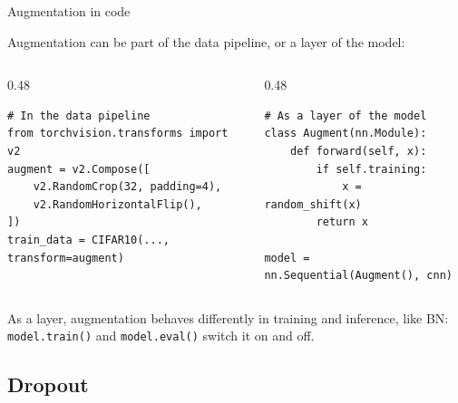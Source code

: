 \documentclass[11pt,aspectratio=169]{beamer}
\begin{document}
\begin{frame}[fragile]{Augmentation in code}
    \setlength{\parskip}{5pt}

    Augmentation can be part of the data pipeline, or a layer of the model:

    \begin{columns}[T,onlytextwidth]
        \begin{column}{0.48\textwidth}
            \scriptsize
            \begin{verbatim}
# In the data pipeline
from torchvision.transforms import v2
augment = v2.Compose([
    v2.RandomCrop(32, padding=4),
    v2.RandomHorizontalFlip(),
])
train_data = CIFAR10(..., transform=augment)
\end{verbatim}
        \end{column}
        \begin{column}{0.48\textwidth}
            \scriptsize
            \begin{verbatim}
# As a layer of the model
class Augment(nn.Module):
    def forward(self, x):
        if self.training:
            x = random_shift(x)
        return x

model = nn.Sequential(Augment(), cnn)
\end{verbatim}
        \end{column}
    \end{columns}

    \begin{tcolorbox}[nndsorange]
        As a layer, augmentation behaves differently in training and inference,
        like BN: \texttt{model.train()} and \texttt{model.eval()} switch it on
        and off.
    \end{tcolorbox}

\end{frame}

\subsection{Dropout}
\end{document}
